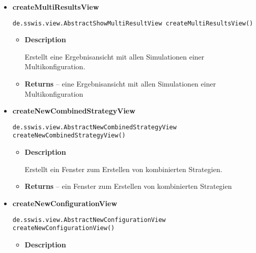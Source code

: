 {{{{\begin{itemize}
{\begin{itemize}
{Erstellt ein Strategieverwaltungsfenster für gemischte Strategien.
}
\item{{\bf  Returns} -- 
ein Strategieverwaltungsfenster gür gemischte Strategien 
}%
\end{itemize}
}%
\item{ 
\hypertarget{de.sswis.controller.AbstractGuiFactory.createMultiResultsView()}{{\bf  createMultiResultsView}\\}
\begin{lstlisting}[frame=none]
de.sswis.view.AbstractShowMultiResultView createMultiResultsView()\end{lstlisting} %
\begin{itemize}
\item{
{\bf  Description}

Erstellt eine Ergebnisansicht mit allen Simulationen einer Multikonfiguration.
}
\item{{\bf  Returns} -- 
eine Ergebnisansicht mit allen Simulationen einer Multikonfiguration 
}%
\end{itemize}
}%
\item{ 
\hypertarget{de.sswis.controller.AbstractGuiFactory.createNewCombinedStrategyView()}{{\bf  createNewCombinedStrategyView}\\}
\begin{lstlisting}[frame=none]
de.sswis.view.AbstractNewCombinedStrategyView createNewCombinedStrategyView()\end{lstlisting} %
\begin{itemize}
\item{
{\bf  Description}

Erstellt ein Fenster zum Erstellen von kombinierten Strategien.
}
\item{{\bf  Returns} -- 
ein Fenster zum Erstellen von kombinierten Strategien 
}%
\end{itemize}
}%
\item{ 
\hypertarget{de.sswis.controller.AbstractGuiFactory.createNewConfigurationView()}{{\bf  createNewConfigurationView}\\}
\begin{lstlisting}[frame=none]
de.sswis.view.AbstractNewConfigurationView createNewConfigurationView()\end{lstlisting} %
\begin{itemize}
\item{
{\bf  Description}

}
\end{itemize}}
\end{itemize}}}}}
